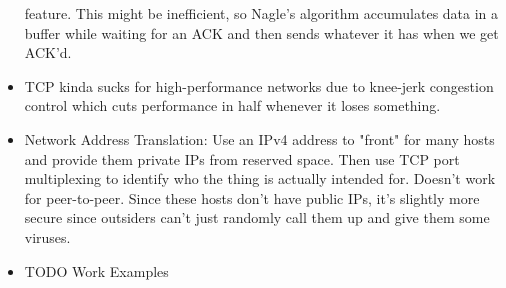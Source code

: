 \documentclass{scrartcl}
\begin{document}
\begin{itemize}
feature. This might be inefficient, so Nagle's algorithm accumulates data
in a buffer while waiting for an ACK and then sends whatever it has when
we get ACK'd.
\item TCP kinda sucks for high-performance networks due to knee-jerk
congestion control which cuts performance in half whenever it loses
something.
\item Network Address Translation: Use an IPv4 address to "front" for
many hosts and provide them private IPs from reserved space.
Then use TCP port multiplexing to identify who the thing is actually
intended for. Doesn't work for peer-to-peer. Since these hosts don't 
have public IPs, it's slightly more secure since outsiders can't just
randomly call them up and give them some viruses.
\item TODO Work Examples
\end{itemize}
\end{document}
